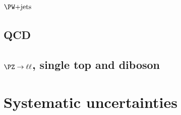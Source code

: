 \subsection{$\WJets$}

\subsection{QCD}

\subsection{$\PZ\to\ell\ell$, single top and diboson}

\section{Systematic uncertainties}
\label{sec:Hhhsystematics}

